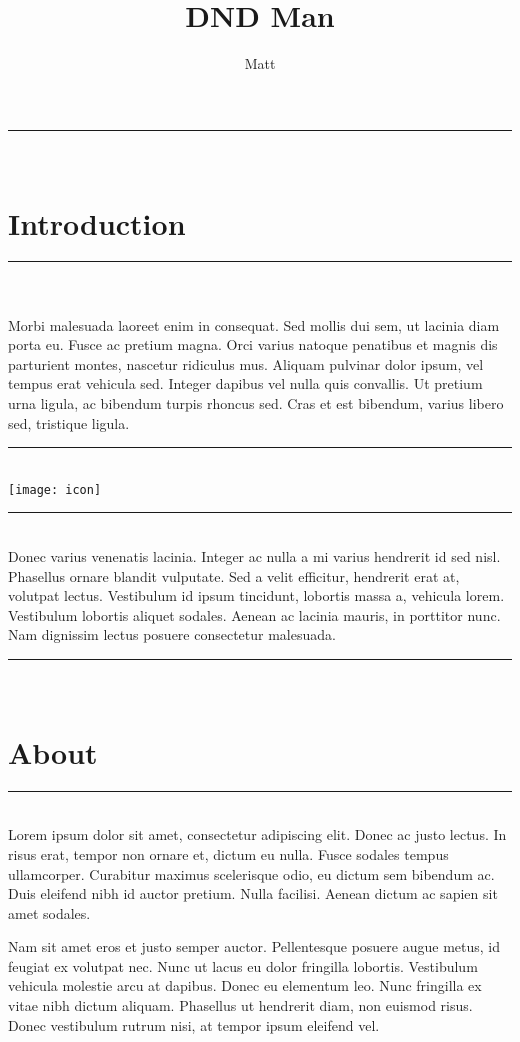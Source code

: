 \documentclass{book}
\title{DND Man}
\author{Matt}
\begin{document}
\begin{multicols}{2}
\noindent\rule{6cm}{0.4pt}\\
\section{Introduction}
\noindent\rule{6cm}{0.4pt}\\\\

Morbi malesuada laoreet enim in consequat. Sed mollis dui sem, ut lacinia diam porta eu. Fusce ac pretium magna. Orci varius natoque penatibus et magnis dis parturient montes, nascetur ridiculus mus. Aliquam pulvinar dolor ipsum, vel tempus erat vehicula sed. Integer dapibus vel nulla quis convallis. Ut pretium urna ligula, ac bibendum turpis rhoncus sed. Cras et est bibendum, varius libero sed, tristique ligula.\\

\noindent\rule{6cm}{0.4pt} \\

\texttt{[image: icon]}

\noindent\rule{6cm}{0.4pt} \\

Donec varius venenatis lacinia. Integer ac nulla a mi varius hendrerit id sed nisl. Phasellus ornare blandit vulputate. Sed a velit efficitur, hendrerit erat at, volutpat lectus. Vestibulum id ipsum tincidunt, lobortis massa a, vehicula lorem. Vestibulum lobortis aliquet sodales. Aenean ac lacinia mauris, in porttitor nunc. Nam dignissim lectus posuere consectetur malesuada.

\noindent\rule{6cm}{0.4pt}\\
\section{About}
\noindent\rule{6cm}{0.4pt}\\

Lorem ipsum dolor sit amet, consectetur adipiscing elit. Donec ac justo lectus. In risus erat, tempor non ornare et, dictum eu nulla. Fusce sodales tempus ullamcorper. Curabitur maximus scelerisque odio, eu dictum sem bibendum ac. Duis eleifend nibh id auctor pretium. Nulla facilisi. Aenean dictum ac sapien sit amet sodales.

Nam sit amet eros et justo semper auctor. Pellentesque posuere augue metus, id feugiat ex volutpat nec. Nunc ut lacus eu dolor fringilla lobortis. Vestibulum vehicula molestie arcu at dapibus. Donec eu elementum leo. Nunc fringilla ex vitae nibh dictum aliquam. Phasellus ut hendrerit diam, non euismod risus. Donec vestibulum rutrum nisi, at tempor ipsum eleifend vel.

\end{multicols}
\end{document}
